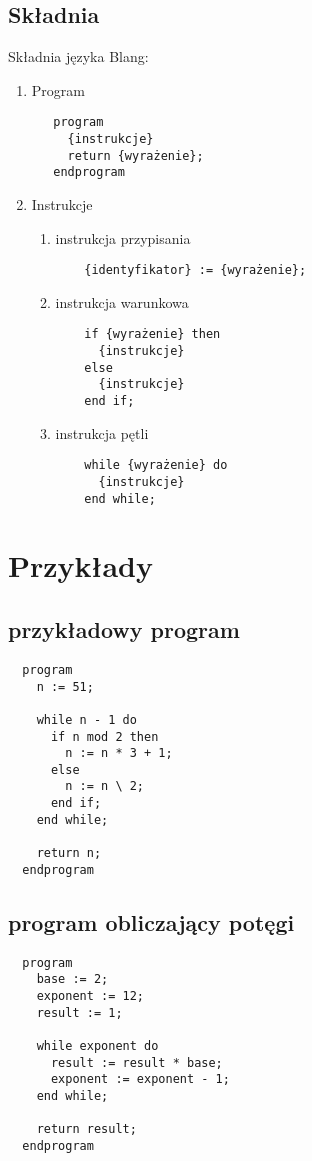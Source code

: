 \documentclass[a4paper,10pt]{article}
\begin{document}
\subsection{Składnia}
Składnia języka Blang:
\begin{enumerate}
 \item Program
  \begin{verbatim}
   program
     {instrukcje}
     return {wyrażenie};
   endprogram
  \end{verbatim}
 \item Instrukcje
 \begin{enumerate}
  \item instrukcja przypisania
   \begin{verbatim}
    {identyfikator} := {wyrażenie};
   \end{verbatim}
  \item instrukcja warunkowa
   \begin{verbatim}
    if {wyrażenie} then
      {instrukcje}
    else
      {instrukcje}
    end if;
   \end{verbatim}
  \item instrukcja pętli
   \begin{verbatim}
    while {wyrażenie} do
      {instrukcje}
    end while;
   \end{verbatim}
 \end{enumerate}
\end{enumerate}

\newpage

\section{Przykłady}

\subsection{przykładowy program}
 \begin{verbatim}
  program
    n := 51;

    while n - 1 do
      if n mod 2 then
        n := n * 3 + 1;
      else
        n := n \ 2;
      end if;
    end while;

    return n;
  endprogram
 \end{verbatim}

\subsection{program obliczający potęgi}
 \begin{verbatim}
  program
    base := 2;
    exponent := 12;
    result := 1;

    while exponent do
      result := result * base;
      exponent := exponent - 1;
    end while;

    return result;
  endprogram
 \end{verbatim}
\end{document}
